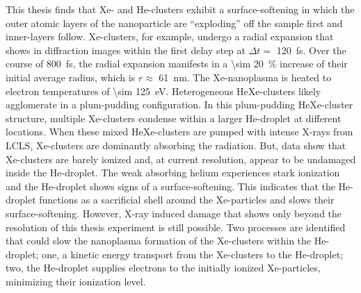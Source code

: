 %
This thesis finds that Xe- and He-clusters exhibit a surface-softening in which the outer atomic layers of the nanoparticle are ``exploding'' off the sample first and inner-layers follow. Xe-clusters, for example, undergo a radial expansion that shows in diffraction images within the first delay step at $\Delta t =$ \SI{120}{\femto\second}. Over the course of \SI{800}{\femto\second}, the radial expansion manifests in a \SI{\sim 20}{\percent} increase of their initial average radius, which is $r\approx$ \SI{61}{\nano\meter}. The Xe-nanoplasma is heated to electron temperatures of \SI{\sim 125}{\electronvolt}. Heterogeneous HeXe-clusters likely agglomerate in a plum-pudding configuration. In this plum-pudding HeXe-cluster structure, multiple Xe-clusters condense within a larger He-droplet at different locations. When these mixed HeXe-clusters are pumped with intense X-rays from LCLS, Xe-clusters are dominantly absorbing the radiation. But, data show that Xe-clusters are barely ionized and, at current resolution, appear to be undamaged inside the He-droplet. The weak absorbing helium experiences stark ionization and the He-droplet shows signs of a surface-softening. This indicates that the He-droplet functions as a sacrificial shell around the Xe-particles and slows their surface-softening. However, X-ray induced damage that shows only beyond the resolution of this thesis experiment is still possible. Two processes are identified that could slow the nanoplasma formation of the Xe-clusters within the He-droplet; one, a kinetic energy transport from the Xe-clusters to the He-droplet; two, the He-droplet supplies electrons to the initially ionized Xe-particles, minimizing their ionization level.\\[1\baselineskip]
%
